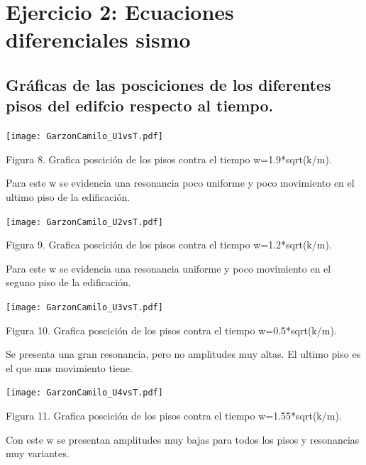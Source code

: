 \documentclass{article}
\begin{document}
\section{Ejercicio 2: Ecuaciones diferenciales sismo} 
\vspace{5mm}
\subsection{    Gráficas de las posciciones de los diferentes pisos del edifcio respecto al tiempo.} 
\vspace{5mm}
\begin{center}
\texttt{[image: GarzonCamilo\_U1vsT.pdf]} 

Figura 8. Grafica poscición de los pisos contra el tiempo w=1.9*sqrt(k/m).
\begin{flushleft}
Para este w se evidencia una resonancia poco uniforme y poco movimiento en el ultimo piso de la edificación.
\end{flushleft}
\texttt{[image: GarzonCamilo\_U2vsT.pdf]} 

Figura 9. Grafica poscición de los pisos contra el tiempo w=1.2*sqrt(k/m).
\begin{flushleft}
Para este w se evidencia una resonancia uniforme y poco movimiento en el seguno piso de la edificación.
\end{flushleft}
\texttt{[image: GarzonCamilo\_U3vsT.pdf]} 


Figura 10. Grafica poscición de los pisos contra el tiempo w=0.5*sqrt(k/m).
\begin{flushleft}
Se presenta una gran resonancia, pero no amplitudes muy altas. El ultimo piso es el que mas movimiento tiene.
\end{flushleft}
\texttt{[image: GarzonCamilo\_U4vsT.pdf]} 


Figura 11. Grafica poscición de los pisos contra el tiempo w=1.55*sqrt(k/m).
\begin{flushleft}
Con este w se presentan amplitudes muy bajas para todos los pisos y resonancias muy variantes.
\end{flushleft}
\end{center}
\end{document}
